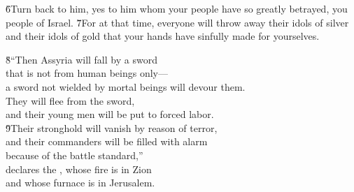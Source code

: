 \v{6}Turn back to him, yes to him whom your people have so greatly betrayed, you people of Israel. \v{7}For at that time, everyone will throw away their idols of silver and their idols of gold that your hands have sinfully made for yourselves.

\begin{poetry}
\poeml \v{8}``Then Assyria will fall by a sword \\
\poemll    that is not from human beings only--- \\
\poemlll       a sword not wielded by mortal beings will devour them. \\
\poeml They will flee from the sword, \\
\poemll    and their young men will be put to forced labor. \\
\poeml \v{9}Their stronghold will vanish by reason of terror, \\
\poemll    and their commanders will be filled with alarm \\
\poemlll       because of the battle standard,'' \\
\poeml declares the , whose fire is in Zion \\
\poemll    and whose furnace is in Jerusalem.
\end{poetry}

